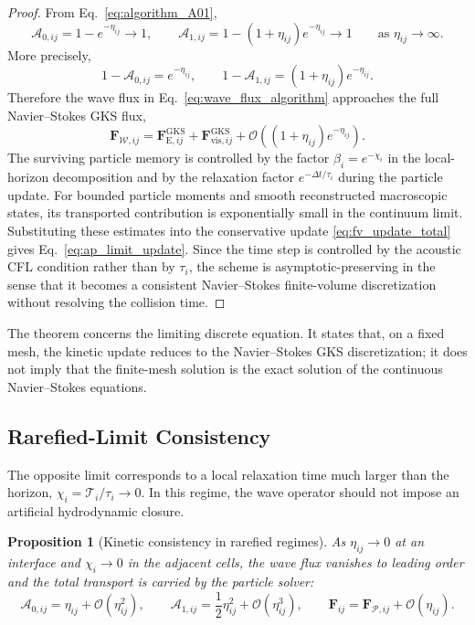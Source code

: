 \documentclass[preprint,12pt]{elsarticle}
\newtheorem{proposition}{Proposition}
\begin{document}
\begin{proof}
From Eq.~\eqref{eq:algorithm_A01},
\begin{equation}
    \mathcal A_{0,ij}=1-e^{-\eta_{ij}}\to1,
    \qquad
    \mathcal A_{1,ij}=1-(1+\eta_{ij})e^{-\eta_{ij}}\to1
    \qquad
    \text{as }\eta_{ij}\to\infty .
\end{equation}
More precisely,
\[
    1-\mathcal A_{0,ij}=e^{-\eta_{ij}},
    \qquad
    1-\mathcal A_{1,ij}=(1+\eta_{ij})e^{-\eta_{ij}} .
\]
Therefore the wave flux in Eq.~\eqref{eq:wave_flux_algorithm} approaches the full Navier--Stokes GKS flux,
\begin{equation}
    \mathbf F_{\mathcal{W},ij}
    =
    \mathbf F_{\mathrm E,ij}^{\mathrm{GKS}}
    +
    \mathbf F_{\mathrm{vis},ij}^{\mathrm{GKS}}
    +
    \mathcal O\!\left((1+\eta_{ij})e^{-\eta_{ij}}\right) .
\end{equation}
The surviving particle memory is controlled by the factor $\beta_i=e^{-\chi_i}$ in the local-horizon decomposition and by the relaxation factor $e^{-\Delta t/\tau_i}$ during the particle update. For bounded particle moments and smooth reconstructed macroscopic states, its transported contribution is exponentially small in the continuum limit. Substituting these estimates into the conservative update \eqref{eq:fv_update_total} gives Eq.~\eqref{eq:ap_limit_update}. Since the time step is controlled by the acoustic CFL condition rather than by $\tau_i$, the scheme is asymptotic-preserving in the sense that it becomes a consistent Navier--Stokes finite-volume discretization without resolving the collision time.
\end{proof}

The theorem concerns the limiting discrete equation. It states that, on a fixed mesh, the kinetic update reduces to the Navier--Stokes GKS discretization; it does not imply that the finite-mesh solution is the exact solution of the continuous Navier--Stokes equations.

\subsection{Rarefied-Limit Consistency}

The opposite limit corresponds to a local relaxation time much larger than the horizon, $\chi_i=\mathcal{T}_i/\tau_i\to0$. In this regime, the wave operator should not impose an artificial hydrodynamic closure.

\begin{proposition}[Kinetic consistency in rarefied regimes]\label{prop:rarefied_consistency}
As $\eta_{ij}\to0$ at an interface and $\chi_i\to0$ in the adjacent cells, the wave flux vanishes to leading order and the total transport is carried by the particle solver:
\begin{equation}\label{eq:rarefied_limit_flux}
    \mathcal A_{0,ij}=\eta_{ij}+\mathcal O(\eta_{ij}^2),
    \qquad
    \mathcal A_{1,ij}=\frac{1}{2}\eta_{ij}^2+\mathcal O(\eta_{ij}^3),
    \qquad
    \mathbf F_{ij}
    =
    \mathbf F_{\mathcal{P},ij}
    +
    \mathcal O(\eta_{ij}) .
\end{equation}
\end{proposition}
\end{document}

